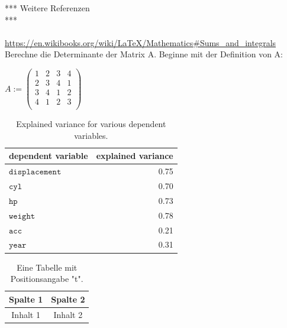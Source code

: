 \documentclass[12pt]{article}
\begin{document}
*** Weitere Referenzen \\
***\\
%
%
{\color{red}{*** Anlagen: Beispiele von Latex Syntax für eine Tabelle und eine Matrix  **}}\\[0.2cm]
%
\url{https://en.wikibooks.org/wiki/LaTeX/Mathematics#Sums_and_integrals}
%
Berechne die Determinante der Matrix A. Beginne mit der Definition von A:
\\[0.1cm]
\begin{center}
\hspace*{0.1cm}

$ A := \left(
   \begin{array}{llll}
     1 & 2 & 3 & 4 \\
     2 & 3 & 4 & 1 \\ 
     3 & 4 & 1 & 2 \\ 
     4 & 1 & 2 & 3 \\ 
   \end{array}
   \right) $ 
\\[0.3cm]

\end{center} 
\begin{table}[h]
  \centering
  \begin{tabular}{|l|r|}
  \hline
  dependent variable      & explained variance   \\
  \hline
  \hline
  $\mathtt{displacement}$ & 0.75                 \\
  \hline
  $\mathtt{cyl}$          & 0.70                 \\
  \hline
  $\mathtt{hp}$           & 0.73                 \\
  \hline
  $\mathtt{weight}$       & 0.78                 \\
  \hline
  $\mathtt{acc}$          & 0.21                 \\
  \hline
  $\mathtt{year}$         & 0.31                 \\
  \hline
  \end{tabular}
  \caption[explained variance]{Explained variance for various dependent variables.}
  \label{tab:explained-variance}
\end{table}

\begin{table}[t] %
  \centering
  \centering
  \begin{tabular}{|c|c|}
    \hline
    Spalte 1 & Spalte 2 \\
    \hline
    Inhalt 1 & Inhalt 2 \\
    \hline
  \end{tabular}
  \caption{Eine Tabelle mit Positionsangabe "t".}
  \label{tab:tabelle_t}
\end{table}
\end{document}
